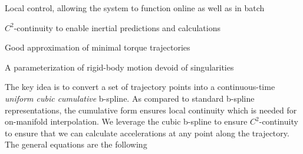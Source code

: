 \begin{DoxyEnumerate}
\item Local control, allowing the system to function online as well as in batch
\item $C^2$-\/continuity to enable inertial predictions and calculations
\item Good approximation of minimal torque trajectories
\item A parameterization of rigid-\/body motion devoid of singularities
\end{DoxyEnumerate}

The key idea is to convert a set of trajectory points into a continuous-\/time {\itshape uniform cubic cumulative} b-\/spline. As compared to standard b-\/spline representations, the cumulative form ensures local continuity which is needed for on-\/manifold interpolation. We leverage the cubic b-\/spline to ensure $C^2$-\/continuity to ensure that we can calculate accelerations at any point along the trajectory. The general equations are the following


